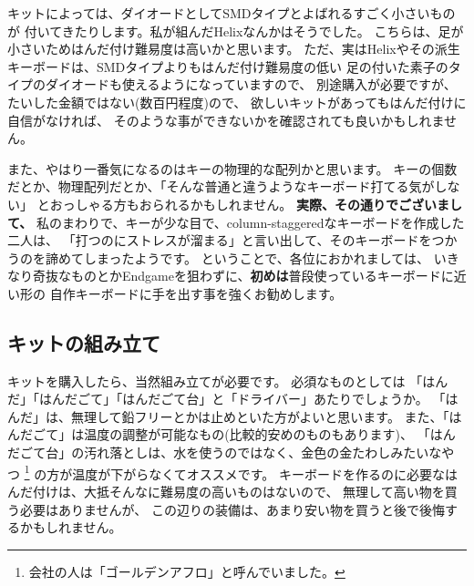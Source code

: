 \documentclass[mingoth,a4paper]{jsarticle}
\begin{document}
キットによっては、ダイオードとしてSMDタイプとよばれるすごく小さいものが
付いてきたりします。私が組んだHelixなんかはそうでした。
こちらは、足が小さいためはんだ付け難易度は高いかと思います。
ただ、実はHelixやその派生キーボードは、SMDタイプよりもはんだ付け難易度の低い
足の付いた素子のタイプのダイオードも使えるようになっていますので、
別途購入が必要ですが、たいした金額ではない(数百円程度)ので、
欲しいキットがあってもはんだ付けに自信がなければ、
そのような事ができないかを確認されても良いかもしれません。

また、やはり一番気になるのはキーの物理的な配列かと思います。
キーの個数だとか、物理配列だとか、「そんな普通と違うようなキーボード打てる気がしない」
とおっしゃる方もおられるかもしれません。
\textbf{実際、その通りでございまして、}
私のまわりで、キーが少な目で、column-staggeredなキーボードを作成した二人は、
「打つのにストレスが溜まる」と言い出して、そのキーボードをつかうのを諦めてしまったようです。
ということで、各位におかれましては、
いきなり奇抜なものとかEndgameを狙わずに、\textbf{初めは}普段使っているキーボードに近い形の
自作キーボードに手を出す事を強くお勧めします。

%
%

\subsection{キットの組み立て}

キットを購入したら、当然組み立てが必要です。
必須なものとしては
「はんだ」「はんだごて」「はんだごて台」と「ドライバー」あたりでしょうか。
「はんだ」は、無理して鉛フリーとかは止めといた方がよいと思います。
また、「はんだごて」は温度の調整が可能なもの(比較的安めのものもあります)、
「はんだごて台」の汚れ落としは、水を使うのではなく、金色の金たわしみたいなやつ%
\footnote{会社の人は「ゴールデンアフロ」と呼んでいました。}
の方が温度が下がらなくてオススメです。
キーボードを作るのに必要なはんだ付けは、大抵そんなに難易度の高いものはないので、
無理して高い物を買う必要はありませんが、
この辺りの装備は、あまり安い物を買うと後で後悔するかもしれません。
\end{document}
